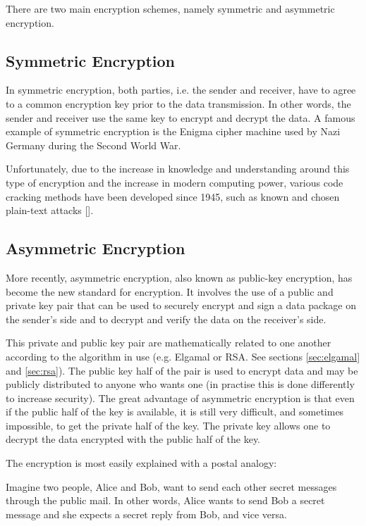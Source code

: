 There are two main encryption schemes, namely symmetric and asymmetric encryption. 

\subsection{Symmetric Encryption}

In symmetric encryption, both parties, i.e. the sender and receiver, have to agree to a common
encryption key prior to the data transmission. In other words, the sender and receiver use the
same key to encrypt and decrypt the data. A famous example of symmetric encryption is the
Enigma cipher machine used by Nazi Germany during the Second World War. 

Unfortunately, due to the increase in knowledge and understanding around this type of
encryption and the increase in modern computing power, various code cracking methods have been
developed since 1945, such as known and chosen plain-text attacks
[\cite{journal:cypher-attacks}]. 

\subsection{Asymmetric Encryption}
\label{sec:assymetric-encryption}

More recently, asymmetric encryption, also known as public-key encryption, has become the new
standard for encryption. It involves the use of a public and private key pair that can be used
to securely encrypt and sign a data package on the sender's side and to decrypt and verify the
data on the receiver's side.

This private and public key pair are mathematically related to one another according to the
algorithm in use (e.g. Elgamal or RSA. See sections \ref{sec:elgamal} and \ref{sec:rsa}). The
public key half of the pair is used to encrypt data and may be publicly distributed to anyone
who wants one (in practise this is done differently to increase security). The great advantage of asymmetric
encryption is that even if the public half of the key is available, it is still very difficult,
and sometimes impossible, to get the private half of the key. The private key allows one to
decrypt the data encrypted with the public half of the key.

The encryption is most easily explained with a postal analogy:

Imagine two people, Alice and Bob, want to send each other secret messages through the public
mail. In other words, Alice wants to send Bob a secret message and she expects a secret reply
from Bob, and vice versa. 

